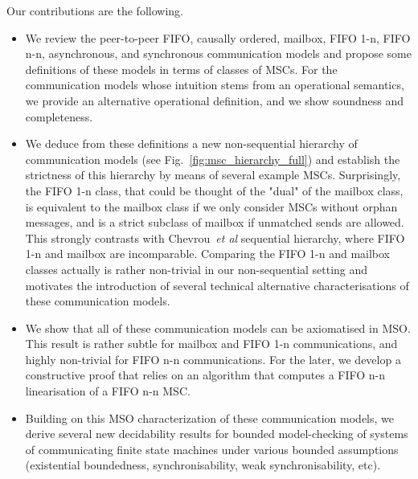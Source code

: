 Our contributions are the following.

\begin{itemize}
	\item We review the peer-to-peer FIFO, causally ordered, mailbox, FIFO 1-n, FIFO n-n, asynchronous, and synchronous communication models
	and propose some definitions of these models in terms of classes of MSCs. For the communication models whose intuition stems from
	an operational semantics, we provide an alternative operational definition, and we show soundness and completeness.

	\item We deduce from these definitions a new non-sequential hierarchy of communication models (see Fig.~\ref{fig:msc_hierarchy_full})
	and establish the strictness of this hierarchy by means of several example MSCs. 
	Surprisingly, the FIFO 1-n class, that could be thought of the "dual" of the mailbox class, is equivalent to the mailbox class if
	we only consider MSCs without orphan messages, and is a strict subclass of mailbox if unmatched sends are allowed. This strongly
	contrasts with Chevrou~\emph{et al} sequential hierarchy, where FIFO 1-n and mailbox are incomparable. Comparing
	the FIFO 1-n and mailbox classes actually is rather non-trivial in our non-sequential setting and motivates the introduction
	of several technical alternative characterisations of these communication models.

	\item We show that all of these communication models can be axiomatised in MSO. This result is rather subtle for mailbox and FIFO 1-n communications, and highly non-trivial for FIFO n-n communications. For the later, we develop a constructive proof that relies on an 
	algorithm that computes a FIFO n-n linearisation of a FIFO n-n MSC.

	\item Building on this MSO characterization of these communication models, we derive several new decidability results for bounded
	model-checking of systems of communicating finite state machines under various bounded assumptions (existential boundedness, synchronisability, weak synchronisability, etc).
\end{itemize}



